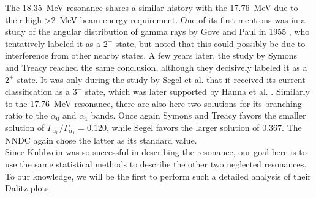 The \SI{18.35}{MeV} resonance shares a similar history with the \SI{17.76}{MeV} due to their high \SI{>2}{MeV} beam energy requirement. One of its first mentions was in a study of the angular distribution of gamma rays by Gove and Paul in 1955 \cite{Gove}, who tentatively labeled it as a $2^+$ state, but noted that this could possibly be due to interference from other nearby states. A few years later, the study by Symons and Treacy \cite{Symons} reached the same conclusion, although they decisively labeled it as a $2^+$ state. It was only during the study by Segel et al. \cite{Segel} that it received its current classification as a $3^-$ state, which was later supported by Hanna et al. \cite{Hanna}. Similarly to the \SI{17.76}{MeV} resonance, there are also here two solutions for its branching ratio to the $\alpha_0$ and $\alpha_1$ bands. Once again Symons and Treacy favors the smaller solution of $\Gamma_{\alpha_0}/\Gamma_{\alpha_1} = 0.120$, while Segel favors the larger solution of $0.367$. The NNDC again chose the latter as its standard value. \\

Since Kuhlwein \cite{Kuhlwein} was so successful in describing the  resonance, our goal here is to use the same statistical methods to describe the other two neglected resonances. To our knowledge, we will be the first to perform such a detailed analysis of their Dalitz plots.